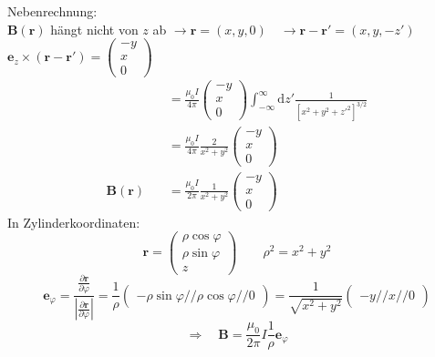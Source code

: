 \documentclass[titlepage,11pt,a4paper,ngerman]{report}
\newcommand{\tx}[1]{\textrm{#1}}
\newcommand{\dd}{\tx{d}}
\newcommand{\prt}[2]{\frac{\partial #1}{\partial #2}}
\renewcommand{\vec}[1]{\boldsymbol{#1}}
\begin{document}
Nebenrechnung:\\
$ \vec{B}(\vec{r}) $ hängt nicht von $ z $ ab $ \rightarrow \vec{r} = (x,y,0) \quad \rightarrow \vec{r} - \vec{r}' = (x,y,-z') $\\
$ \vec{e}_z \times (\vec{r} - \vec{r}') = \begin{pmatrix}
-y \\ x \\ 0
\end{pmatrix} $
\begin{align*}
\qquad \qquad &= \frac{\mu_0 I}{4 \pi} \begin{pmatrix}
-y \\ x \\ 0
\end{pmatrix} \int_{-\infty}^{\infty} \dd z' \frac{1}{[x^2 + y^2 + z'^2]^{3/2}}\\
&= \frac{\mu_0 I}{4 \pi} \frac{2}{x^2 + y^2} \begin{pmatrix}
-y \\ x \\ 0
\end{pmatrix}\\
\vec{B} (\vec{r}) &= \frac{\mu_0 I}{2 \pi} \frac{1}{x^2 + y^2} \begin{pmatrix}
-y \\ x \\ 0
\end{pmatrix}
\end{align*}
In Zylinderkoordinaten:
\begin{equation*}
\vec{r} = \begin{pmatrix}
\rho \cos \varphi \\ \rho \sin \varphi \\ z
\end{pmatrix} \qquad \rho^2 = x^2 + y^2
\end{equation*}
\begin{equation*}
\vec{e}_{\varphi} = \frac{\prt{\vec{r}}{\varphi}}{|\prt{\vec{r}}{\varphi}|} = \frac{1}{\rho} \begin{pmatrix}
- \rho \sin \varphi // \rho \cos \varphi // 0
\end{pmatrix} = \frac{1}{\sqrt{x^2 + y^2}} \begin{pmatrix}
-y // x // 0
\end{pmatrix}
\end{equation*}
\begin{equation*}
\Rightarrow \quad \vec{B} = \frac{\mu_0}{2 \pi} I \frac{1}{\rho} \vec{e}_{\varphi}
\end{equation*}
\end{document}
